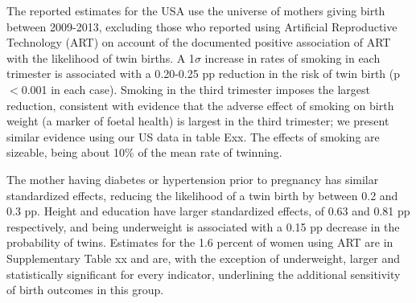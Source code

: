 \documentclass{nature}
\begin{document}
\begin{linenumbers}

The reported estimates for the USA use the universe of mothers giving birth between 2009-2013, excluding those who reported using Artificial Reproductive Technology (ART) on account of the documented positive association of ART with the likelihood of twin births\cite{Vitthalaetal2009}. A 1$\sigma$ increase in rates of smoking in each trimester is associated with a 0.20-0.25 pp reduction in the risk of twin birth (p$<$0.001 in each case). Smoking in the third trimester imposes the largest reduction, consistent with evidence that the adverse effect of smoking on birth weight (a marker of foetal health) is largest in the third trimester\cite{Bernsteinetal2005}; we present similar evidence using our US data in  table Exx. The effects of smoking are sizeable, being about 10\% of the mean rate of twinning. 


The mother having diabetes or hypertension prior to pregnancy has similar standardized effects, reducing the likelihood of a twin birth by between 0.2 and 0.3 pp. Height and education have larger standardized effects, of 0.63 and 0.81 pp respectively, and being underweight is associated with a 0.15 pp decrease in the probability of twins. Estimates for the 1.6 percent of women using ART are in Supplementary Table xx and are, with the exception of underweight, larger and statistically significant for every indicator, underlining the additional sensitivity of birth outcomes in this group. 


\end{linenumbers}
\end{document}
